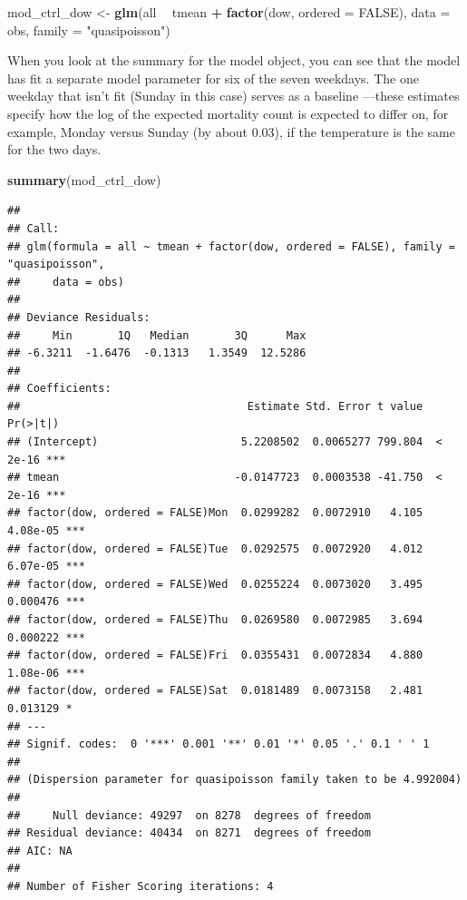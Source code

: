 \documentclass[
]{book}
\newenvironment{Shaded}{\begin{snugshade}}{\end{snugshade}}
\newcommand{\DataTypeTok}[1]{\textcolor[rgb]{0.13,0.29,0.53}{#1}}
\newcommand{\KeywordTok}[1]{\textcolor[rgb]{0.13,0.29,0.53}{\textbf{#1}}}
\newcommand{\NormalTok}[1]{#1}
\newcommand{\OperatorTok}[1]{\textcolor[rgb]{0.81,0.36,0.00}{\textbf{#1}}}
\newcommand{\OtherTok}[1]{\textcolor[rgb]{0.56,0.35,0.01}{#1}}
\newcommand{\StringTok}[1]{\textcolor[rgb]{0.31,0.60,0.02}{#1}}
\begin{document}
\begin{Shaded}
\begin{Highlighting}[]
\NormalTok{mod_ctrl_dow <-}\StringTok{ }\KeywordTok{glm}\NormalTok{(all }\OperatorTok{~}\StringTok{ }\NormalTok{tmean }\OperatorTok{+}\StringTok{ }\KeywordTok{factor}\NormalTok{(dow, }\DataTypeTok{ordered =} \OtherTok{FALSE}\NormalTok{), }
                    \DataTypeTok{data =}\NormalTok{ obs, }\DataTypeTok{family =} \StringTok{"quasipoisson"}\NormalTok{)}
\end{Highlighting}
\end{Shaded}

When you look at the summary for the model object, you can see that the
model has fit a separate model parameter for six of the seven weekdays. The one
weekday that isn't fit (Sunday in this case) serves as a baseline ---these
estimates specify how the log of the expected mortality count is expected to
differ on, for example, Monday versus Sunday (by about 0.03), if the temperature
is the same for the two days.

\begin{Shaded}
\begin{Highlighting}[]
\KeywordTok{summary}\NormalTok{(mod_ctrl_dow)}
\end{Highlighting}
\end{Shaded}

\begin{verbatim}
## 
## Call:
## glm(formula = all ~ tmean + factor(dow, ordered = FALSE), family = "quasipoisson", 
##     data = obs)
## 
## Deviance Residuals: 
##     Min       1Q   Median       3Q      Max  
## -6.3211  -1.6476  -0.1313   1.3549  12.5286  
## 
## Coefficients:
##                                   Estimate Std. Error t value Pr(>|t|)    
## (Intercept)                      5.2208502  0.0065277 799.804  < 2e-16 ***
## tmean                           -0.0147723  0.0003538 -41.750  < 2e-16 ***
## factor(dow, ordered = FALSE)Mon  0.0299282  0.0072910   4.105 4.08e-05 ***
## factor(dow, ordered = FALSE)Tue  0.0292575  0.0072920   4.012 6.07e-05 ***
## factor(dow, ordered = FALSE)Wed  0.0255224  0.0073020   3.495 0.000476 ***
## factor(dow, ordered = FALSE)Thu  0.0269580  0.0072985   3.694 0.000222 ***
## factor(dow, ordered = FALSE)Fri  0.0355431  0.0072834   4.880 1.08e-06 ***
## factor(dow, ordered = FALSE)Sat  0.0181489  0.0073158   2.481 0.013129 *  
## ---
## Signif. codes:  0 '***' 0.001 '**' 0.01 '*' 0.05 '.' 0.1 ' ' 1
## 
## (Dispersion parameter for quasipoisson family taken to be 4.992004)
## 
##     Null deviance: 49297  on 8278  degrees of freedom
## Residual deviance: 40434  on 8271  degrees of freedom
## AIC: NA
## 
## Number of Fisher Scoring iterations: 4
\end{verbatim}
\end{document}
